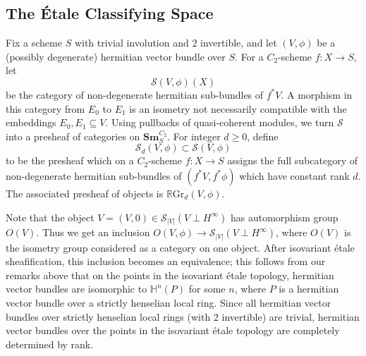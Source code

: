 \documentclass[draftthesis,tocnosub,noragright,centerchapter,10pt]{uiucthesis2009}
\newcommand{\mbb}{\mathbb}
\newcommand{\mc}{\mathcal}
\newcommand{\RGr}{\mathbb R\mathrm{Gr}}
\newcommand{\Sm}[1]{\mathbf{Sm}_{#1}}
\newcommand{\BigVB}[1]{\mathbf{BigVB}({#1})}
\DeclareMathOperator{\Hom}{Hom}
\DeclareMathOperator{\PreSm}{Pre_{Sm_S^{C_2}}}
\theoremstyle{plain}
\theoremstyle{definition}
\begin{document}



\subsection{The \'Etale Classifying Space}

Fix a scheme $S$ with trivial involution and 2 invertible, and let $(V,\phi)$ be a
(possibly degenerate) hermitian vector bundle over $S$. For a
$C_2$-scheme $f : X \rightarrow S$, let
\[
\mc S(V,\phi)(X)
\]
be the category of non-degenerate hermitian sub-bundles of $f^*V$. A
morphism in this category from $E_0$ to $E_1$ is an isometry not
necessarily compatible with the embeddings $E_0,E_1 \subseteq
V$. Using pullbacks of quasi-coherent modules, we turn $\mc S$ into a presheaf of categories on
$\Sm{S}^{C_2}$. For integer $d \geq 0$, define
\[
\mc S_d(V,\phi)  \subset \mc S(V,\phi)
\]
to be the presheaf which on a $C_2$-scheme $f : X \rightarrow S$
assigns the full subcategory of non-degenerate hermitian sub-bundles
of $(f^*V,f^*\phi)$ which have constant rank $d$. The associated
presheaf of objects is $\RGr_d(V,\phi)$.

Note that the object $V = (V,0) \in \mc S_{|V|}(V \perp H^\infty)$ has
automorphism group $O(V)$. Thus we get an inclusion $O(V,\phi)
\rightarrow \mc S_{|V|}(V \perp H^\infty) $, where $O(V)$ is the
isometry group considered as a category on one object. After isovariant \'etale
sheafification, this inclusion becomes an equivalence; this follows
from our remarks above that on the points in the isovariant \'etale
topology, hermitian vector bundles are isomorphic to $\mbb H^n(P)$ for
some $n$, where $P$ is a hermitian vector bundle over a strictly
henselian local ring. Since all hermitian vector bundles over strictly
henselian local rings (with 2 invertible) are trivial, hermitian vector bundles over the
points in the isovariant \'etale topology are completely determined by
rank. 
\end{document}
